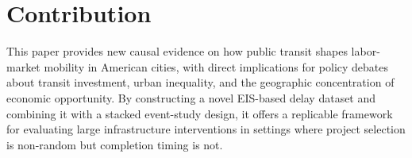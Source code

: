 \documentclass[12pt]{article}
\begin{document}
\section{Contribution}

This paper provides new causal evidence on how public transit shapes labor-market mobility in American cities, with direct implications for policy debates about transit investment, urban inequality, and the geographic concentration of economic opportunity. By constructing a novel EIS-based delay dataset and combining it with a stacked event-study design, it offers a replicable framework for evaluating large infrastructure interventions in settings where project selection is non-random but completion timing is not.

\newpage
\printbibliography
\end{document}
